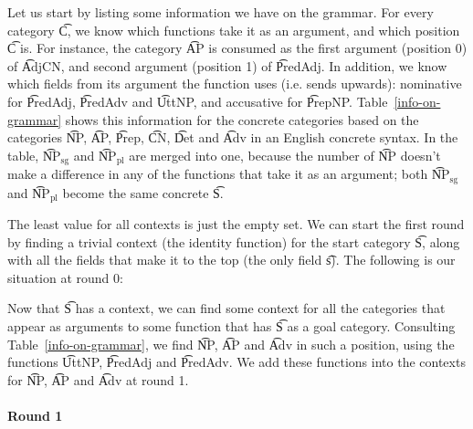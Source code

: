 Let us start by listing some information we have on the grammar.  For
every category \t{C}, we know which functions take it as an argument,
and which position \t{C} is. For instance, the category \t{AP} is
consumed as the first argument (position 0) of \t{AdjCN}, and second
argument (position 1) of \t{PredAdj}.  In addition, we know which
fields from its argument the function uses (i.e. sends upwards):
nominative for \t{PredAdj}, \t{PredAdv} and \t{UttNP}, and accusative
for \t{PrepNP}.  Table~\ref{info-on-grammar} shows this information
for the concrete categories based on the \gf{} categories \t{NP},
\t{AP}, \t{Prep}, \t{CN}, \t{Det} and \t{Adv} in an English concrete
syntax.  In the table, \t{NP$_{\text{sg}}$} and \t{NP$_{\text{pl}}$}
are merged into one, because the number of \t{NP} doesn't make a
difference in any of the functions that take it as an argument; both
\t{NP$_{\text{sg}}$} and \t{NP$_{\text{pl}}$} become the same concrete
\t{S}.

The least value for all contexts is just the empty set. We can start
the first round by finding a trivial context (the identity function)
for the start category \t{S}, along with all the fields that make it
to the top (the only field \t{s}). The following is our situation at round 0:

\begin{EmptyItem}
\begin{HighlightingFancy}[]
    \OtherTok{::=} 
  \OtherTok{::=} \NormalTok{\{ \}}
   \OtherTok{::=} \NormalTok{\{ \}}
  \OtherTok{::=} \NormalTok{\{ \}}
   \OtherTok{::=} \NormalTok{\{ \}}
 \OtherTok{::=} \NormalTok{\{ \}}
 \OtherTok{::=} \NormalTok{\{ \}}
\end{HighlightingFancy}
\end{EmptyItem}

\noindent Now that \t{S} has a context, we can find some context for all the
categories that appear as arguments to some function that has \t{S} as
a goal category. Consulting Table~\ref{info-on-grammar}, we find
\t{NP}, \t{AP} and \t{Adv} in such a position, using the functions \t{UttNP},
\t{PredAdj} and \t{PredAdv}. We add these functions into
the contexts for \t{NP}, \t{AP} and \t{Adv} at round 1.

\paragraph{Round 1}

